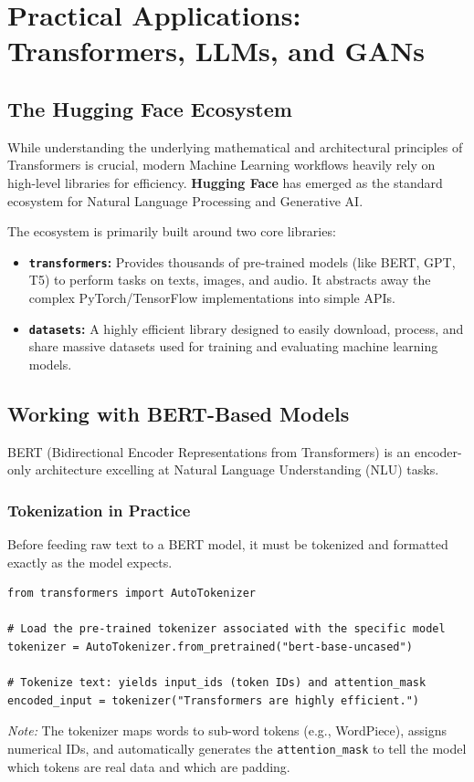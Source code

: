 \chapter*{Practical Applications: Transformers, LLMs, and GANs}

\section*{The Hugging Face Ecosystem}

While understanding the underlying mathematical and architectural principles of Transformers is crucial, modern Machine Learning workflows heavily rely on high-level libraries for efficiency. \textbf{Hugging Face} has emerged as the standard ecosystem for Natural Language Processing and Generative AI.

\begin{definition}
The ecosystem is primarily built around two core libraries:
\begin{itemize}
    \item \textbf{\texttt{transformers}:} Provides thousands of pre-trained models (like BERT, GPT, T5) to perform tasks on texts, images, and audio. It abstracts away the complex PyTorch/TensorFlow implementations into simple APIs.
    \item \textbf{\texttt{datasets}:} A highly efficient library designed to easily download, process, and share massive datasets used for training and evaluating machine learning models.
\end{itemize}
\end{definition}

\section*{Working with BERT-Based Models}

BERT (Bidirectional Encoder Representations from Transformers) is an encoder-only architecture excelling at Natural Language Understanding (NLU) tasks.

\subsection*{Tokenization in Practice}
Before feeding raw text to a BERT model, it must be tokenized and formatted exactly as the model expects.
\begin{lstlisting}[style=pythonstyle]
from transformers import AutoTokenizer

# Load the pre-trained tokenizer associated with the specific model
tokenizer = AutoTokenizer.from_pretrained("bert-base-uncased")

# Tokenize text: yields input_ids (token IDs) and attention_mask
encoded_input = tokenizer("Transformers are highly efficient.")
\end{lstlisting}
\textit{Note:} The tokenizer maps words to sub-word tokens (e.g., WordPiece), assigns numerical IDs, and automatically generates the \texttt{attention\_mask} to tell the model which tokens are real data and which are padding.

